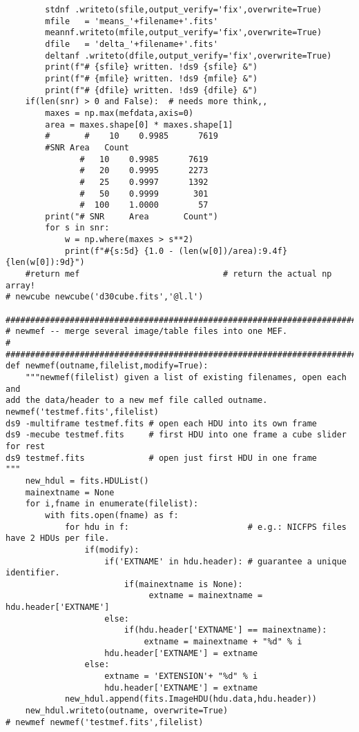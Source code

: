 {\begin{verbatim}
        stdnf .writeto(sfile,output_verify='fix',overwrite=True)
        mfile   = 'means_'+filename+'.fits'
        meannf.writeto(mfile,output_verify='fix',overwrite=True)
        dfile   = 'delta_'+filename+'.fits'
        deltanf .writeto(dfile,output_verify='fix',overwrite=True)
        print(f"# {sfile} written. !ds9 {sfile} &")
        print(f"# {mfile} written. !ds9 {mfile} &")
        print(f"# {dfile} written. !ds9 {dfile} &")
    if(len(snr) > 0 and False):  # needs more think,,
        maxes = np.max(mefdata,axis=0)
        area = maxes.shape[0] * maxes.shape[1]
        #       #    10    0.9985      7619
        #SNR Area   Count
               #   10    0.9985      7619
               #   20    0.9995      2273
               #   25    0.9997      1392
               #   50    0.9999       301
               #  100    1.0000        57
        print("# SNR     Area       Count")
        for s in snr:
            w = np.where(maxes > s**2)
            print(f"#{s:5d} {1.0 - (len(w[0])/area):9.4f} {len(w[0]):9d}")
    #return mef                             # return the actual np array!
# newcube newcube('d30cube.fits','@l.l')

#############################################################################
# newmef -- merge several image/table files into one MEF.
#
#############################################################################
def newmef(outname,filelist,modify=True):
    """newmef(filelist) given a list of existing filenames, open each and
add the data/header to a new mef file called outname.
newmef('testmef.fits',filelist)
ds9 -multiframe testmef.fits # open each HDU into its own frame
ds9 -mecube testmef.fits     # first HDU into one frame a cube slider for rest
ds9 testmef.fits             # open just first HDU in one frame
"""
    new_hdul = fits.HDUList()
    mainextname = None
    for i,fname in enumerate(filelist):
        with fits.open(fname) as f:
            for hdu in f:                        # e.g.: NICFPS files have 2 HDUs per file.
                if(modify):
                    if('EXTNAME' in hdu.header): # guarantee a unique identifier.
                        if(mainextname is None):
                             extname = mainextname = hdu.header['EXTNAME']
                    else:
                        if(hdu.header['EXTNAME'] == mainextname):
                            extname = mainextname + "%d" % i
                    hdu.header['EXTNAME'] = extname
                else:
                    extname = 'EXTENSION'+ "%d" % i
                    hdu.header['EXTNAME'] = extname
            new_hdul.append(fits.ImageHDU(hdu.data,hdu.header))
    new_hdul.writeto(outname, overwrite=True)
# newmef newmef('testmef.fits',filelist)


\end{verbatim}}
